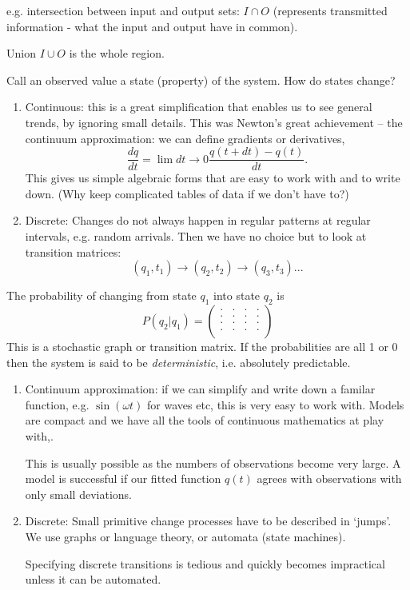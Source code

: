 \documentclass{slides}
\begin{document}
e.g. intersection between input and output sets: $I \cap O$ (represents transmitted information - what the input and output have in common).


Union $I \cup O$ is the whole region.



Call an observed value a state (property) of the system. How do states change?

\begin{enumerate}
\item Continuous: this is a great simplification that enables us to see general trends, by
ignoring small details. This was Newton's great achievement -- the continuum approximation:
we can define gradients or derivatives,
$$
\frac{dq}{dt} = \lim{dt\rightarrow 0} \frac{q(t+dt)-q(t)}{dt}.
$$
This gives us simple algebraic forms that are easy to work with and to write down.
(Why keep complicated tables of data if we don't have to?)

\item Discrete: Changes do not always happen in regular patterns at regular intervals, e.g.
random arrivals. Then we have no choice but to look at transition matrices:
$$
(q_1,t_1) \rightarrow  (q_2,t_2)\rightarrow  (q_3,t_3) ...
$$

\end{enumerate}


The probability of changing from state $q_1$ into state $q_2$ is
$$
P(q_2|q_1) = 
\left(
\begin{array}{cccc}
. & . & . & .\\
. & . & . & .\\
. & . & . & .\\
. & . & . & .\\
\end{array}
\right)
$$
This is a stochastic graph or transition matrix. If the probabilities are all 1 or 0 then
the system is said to be {\em deterministic}, i.e. absolutely predictable.





\begin{enumerate}
\item Continuum approximation: if we can simplify and write down a familar function,
e.g. $\sin(\omega t)$ for waves etc, this is very easy to work with. Models are compact and
we have all the tools of continuous mathematics at play with,.

This is usually possible as the numbers of observations become very large. A model is successful
if our fitted function $q(t)$ agrees with observations with only small deviations.

\item Discrete: Small primitive change processes have to be described in `jumps'.
We use graphs or language theory, or automata (state machines).

Specifying discrete transitions is tedious and quickly becomes impractical unless it can
be automated.
\end{enumerate}
\end{document}
